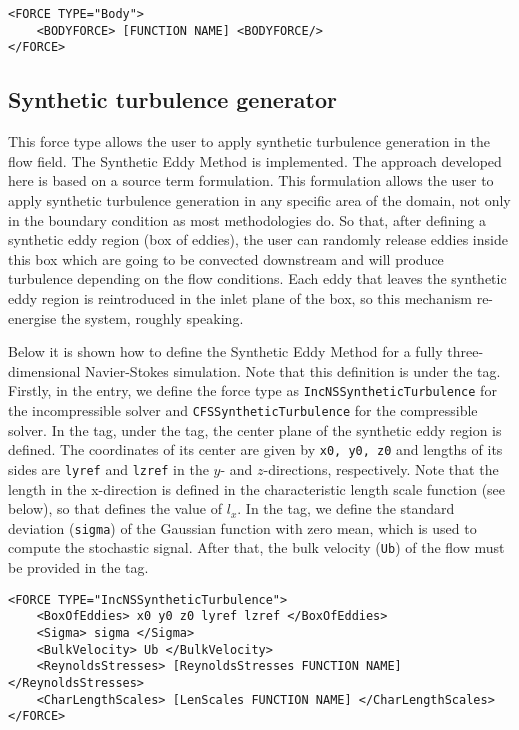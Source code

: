 \begin{lstlisting}[style=XMLStyle] 
<FORCE TYPE="Body">
    <BODYFORCE> [FUNCTION NAME] <BODYFORCE/>
</FORCE>
\end{lstlisting}

\subsection{Synthetic turbulence generator}
This force type allows the user to apply synthetic turbulence generation in the flow field. The Synthetic Eddy Method is implemented. The approach developed here is based on a source term formulation. This formulation allows the user to apply synthetic turbulence generation in any specific area of the domain, not only in the boundary condition as most methodologies do. So that, after defining a synthetic eddy region (box of eddies), the user can randomly release eddies inside this box which are going to be convected downstream and will produce turbulence depending on the flow conditions. Each eddy  that leaves the synthetic eddy region is reintroduced in the inlet plane of the box, so this mechanism re-energise the system, roughly speaking. 

Below it is shown how to define the Synthetic Eddy Method for a fully three-dimensional Navier-Stokes simulation. Note that this definition is under the  tag. Firstly, in the  entry, we define the force type as \texttt{IncNSSyntheticTurbulence} for the incompressible solver and \texttt{CFSSyntheticTurbulence} for the compressible solver. In the  tag, under the  tag, the center plane of the synthetic eddy region is defined. The coordinates of its center are given by \texttt{x0, y0, z0} and lengths of its sides are \texttt{lyref}  and \texttt{lzref} in the $y$- and $z$-directions, respectively. Note that the length in the x-direction is defined in the characteristic length scale function (see below), so that   defines the value of $l_{x}$. In the  tag, we define the standard deviation (\texttt{sigma}) of the Gaussian function with zero mean, which is used to compute the stochastic signal. After that, the bulk velocity (\texttt{Ub}) of the flow must be provided in the  tag. 

\begin{lstlisting}[style=XMLStyle] 
<FORCE TYPE="IncNSSyntheticTurbulence">
    <BoxOfEddies> x0 y0 z0 lyref lzref </BoxOfEddies>
    <Sigma> sigma </Sigma>
    <BulkVelocity> Ub </BulkVelocity>
    <ReynoldsStresses> [ReynoldsStresses FUNCTION NAME] </ReynoldsStresses>
    <CharLengthScales> [LenScales FUNCTION NAME] </CharLengthScales>
</FORCE>
\end{lstlisting}

